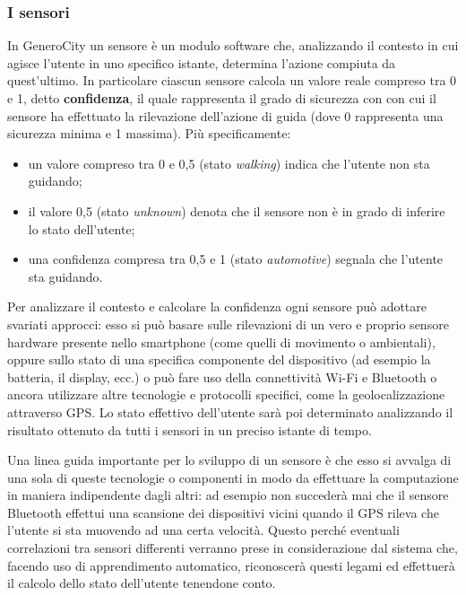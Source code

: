 \subsubsection{I sensori}
In GeneroCity un sensore è un modulo software che, analizzando il contesto in cui agisce l'utente in uno specifico istante, determina l'azione compiuta da quest'ultimo. In particolare ciascun sensore calcola un valore reale compreso tra 0 e 1, detto \textbf{confidenza}, il quale rappresenta il grado di sicurezza con con cui il sensore ha effettuato la rilevazione dell'azione di guida (dove 0 rappresenta una sicurezza minima e 1 massima). Più specificamente:
\begin{itemize}
    \item un valore compreso tra 0 e 0,5 (stato \textit{walking}) indica che l'utente non sta guidando;
    \item il valore 0,5 (stato \textit{unknown}) denota che il sensore non è in grado di inferire lo stato dell'utente;
    \item una confidenza compresa tra 0,5 e 1 (stato \textit{automotive}) segnala che l'utente sta guidando.
\end{itemize}

Per analizzare il contesto e calcolare la confidenza ogni sensore può adottare svariati approcci: esso si può basare sulle rilevazioni di un vero e proprio sensore hardware presente nello smartphone (come quelli di movimento o ambientali), oppure sullo stato di una specifica componente del dispositivo (ad esempio la batteria, il display, ecc.) o può fare uso della connettività Wi-Fi e Bluetooth o ancora utilizzare altre tecnologie e protocolli specifici, come la geolocalizzazione attraverso GPS. Lo stato effettivo dell'utente sarà poi determinato analizzando il risultato ottenuto da tutti i sensori in un preciso istante di tempo.

Una linea guida importante per lo sviluppo di un sensore è che esso si avvalga di una sola di queste tecnologie o componenti in modo da effettuare la computazione in maniera indipendente dagli altri: ad esempio non succederà mai che il sensore Bluetooth effettui una scansione dei dispositivi vicini quando il GPS rileva che l'utente si sta muovendo ad una certa velocità. Questo perché eventuali correlazioni tra sensori differenti verranno prese in considerazione dal sistema che, facendo uso di apprendimento automatico, riconoscerà questi legami ed effettuerà il calcolo dello stato dell'utente tenendone conto.


